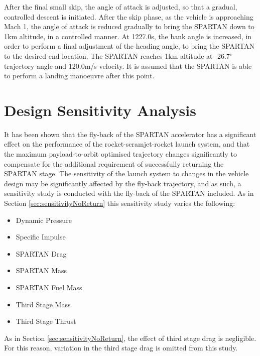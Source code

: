 After the final small skip, the angle of attack is adjusted, so that a gradual, controlled descent is initiated. 
After the skip phase, as the vehicle is approaching Mach 1, the angle of attack is reduced gradually to bring the SPARTAN down to 1km altitude, in a controlled manner. At 1227.0s, the bank angle is increased, in order to perform a final adjustment of the heading angle, to bring the SPARTAN to the desired end location. 
The SPARTAN reaches 1km altitude at -26.7$^\circ$ trajectory angle and 120.0m/s velocity. It is assumed that the SPARTAN is able to perform a landing manoeuvre after this point. 








\section{Design Sensitivity Analysis}

It has been shown that the fly-back of the SPARTAN accelerator has a significant effect on the performance of the rocket-scramjet-rocket launch system, and that the maximum payload-to-orbit optimised trajectory changes significantly to compensate for the additional requirement of successfully returning the SPARTAN stage. The sensitivity of the launch system to changes in the vehicle design may be significantly affected by the fly-back trajectory, and as such, a sensitivity study is conducted with the fly-back of the SPARTAN included. As in Section \ref{sec:sensitivityNoReturn} this sensitivity study varies the following:
\begin{itemize}
	\item Dynamic Pressure
	\item Specific Impulse
	\item SPARTAN Drag
	\item SPARTAN Mass
	\item SPARTAN Fuel Mass
	\item Third Stage Mass
	\item Third Stage Thrust
\end{itemize}
As in Section \ref{sec:sensitivityNoReturn}, the effect of third stage drag is negligible. For this reason, variation in the third stage drag is omitted from this study. 



